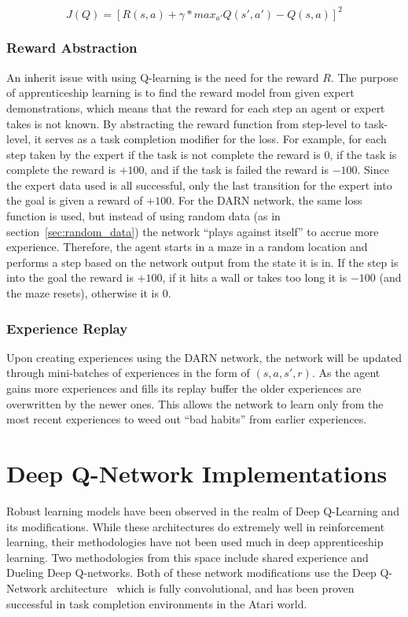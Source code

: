 \documentclass[12pt,american]{report}
\begin{document}
\begin{equation}
     \label{eq:dal-dqn-loss}
     J(Q) = [R(s,a)+\gamma*max_{a'}Q(s',a')-Q(s,a)]^2
\end{equation}
\subsubsection{Reward Abstraction}
An inherit issue with using Q-learning is the need for the reward $R$.  The purpose of apprenticeship learning is to find the reward model from given expert demonstrations, which means that the reward for each step an agent or expert takes is not known. By abstracting the reward function from step-level to task-level, it serves as a task completion modifier for the loss.  For example, for each step taken by the expert if the task is not complete the reward is $0$, if the task is complete the reward is $+100$, and if the task is failed the reward is $-100$.  Since the expert data used is all successful, only the last transition for the expert into the goal is given a reward of $+100$.  For the DARN network, the same loss function is used, but instead of using random data (as in section~\ref{sec:random_data}) the network ``plays against itself'' to accrue more experience.  Therefore, the agent starts in a maze in a random location and performs a step based on the network output from the state it is in.  If the step is into the goal the reward is $+100$, if it hits a wall or takes too long it is $-100$ (and the maze resets), otherwise it is $0$.  

\subsubsection{Experience Replay}
Upon creating experiences using the DARN network, the network will be updated through mini-batches of experiences in the form of $(s,a,s',r)$. As the agent gains more experiences and fills its replay buffer the older experiences are overwritten by the newer ones.  This allows the network to learn only from the most recent experiences to weed out ``bad habits'' from earlier experiences. 

\section{Deep Q-Network Implementations}
Robust learning models have been observed in the realm of Deep Q-Learning and its modifications.  While these architectures do extremely well in reinforcement learning, their methodologies have not been used much in deep apprenticeship learning.  Two methodologies from this space include shared experience and Dueling Deep Q-networks.  Both of these network modifications use the Deep Q-Network architecture~\cite{atari} which is fully convolutional, and has been proven successful in task completion environments in the Atari world.
\end{document}

